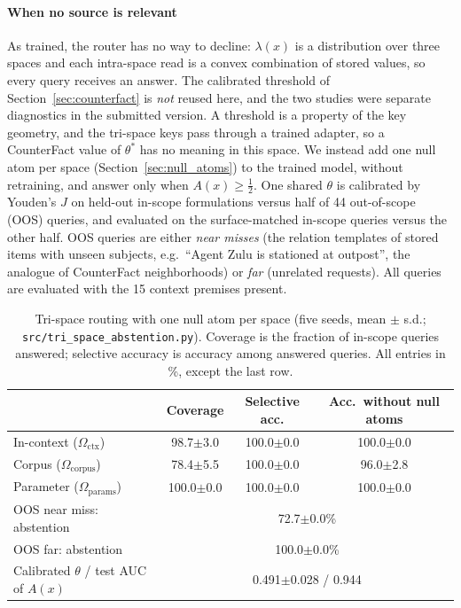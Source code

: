 \documentclass[preprint,12pt]{elsarticle}
\newcommand{\Om}{\Omega}
\newif\ifmarkchanges
\newcommand{\rev}[1]{\ifmarkchanges{\color{blue}#1}\else#1\fi}
\begin{document}
\paragraph{When no source is relevant}
\rev{As trained, the router has no way to decline: $\lambda(x)$ is a distribution over three spaces and each intra-space read is a convex combination of stored values, so every query receives an answer. The calibrated threshold of Section~\ref{sec:counterfact} is \emph{not} reused here, and the two studies were separate diagnostics in the submitted version. A threshold is a property of the key geometry, and the tri-space keys pass through a trained adapter, so a CounterFact value of $\theta^*$ has no meaning in this space. We instead add one null atom per space (Section~\ref{sec:null_atoms}) to the trained model, without retraining, and answer only when $A(x)\ge\tfrac12$. One shared $\theta$ is calibrated by Youden's $J$ on held-out in-scope formulations versus half of 44 out-of-scope (OOS) queries, and evaluated on the surface-matched in-scope queries versus the other half. OOS queries are either \emph{near misses} (the relation templates of stored items with unseen subjects, e.g.\ ``Agent Zulu is stationed at outpost'', the analogue of CounterFact neighborhoods) or \emph{far} (unrelated requests). All queries are evaluated with the 15 context premises present.}

\begin{table}[t]
\centering
\caption{\rev{Tri-space routing with one null atom per space (five seeds, mean $\pm$ s.d.; \texttt{src/tri\_space\_abstention.py}). Coverage is the fraction of in-scope queries answered; selective accuracy is accuracy among answered queries. All entries in \%, except the last row.}}
\label{tab:abstention}
\vspace{0.5em}
\footnotesize
\begin{tabular}{@{}lccc@{}}
\toprule
 & Coverage & Selective acc. & Acc.\ without null atoms \\
\midrule
In-context ($\Om_{\mathrm{ctx}}$) & 98.7$\pm$3.0 & 100.0$\pm$0.0 & 100.0$\pm$0.0 \\
Corpus ($\Om_{\mathrm{corpus}}$) & 78.4$\pm$5.5 & 100.0$\pm$0.0 & 96.0$\pm$2.8 \\
Parameter ($\Om_{\mathrm{params}}$) & 100.0$\pm$0.0 & 100.0$\pm$0.0 & 100.0$\pm$0.0 \\
\midrule
OOS near miss: abstention & \multicolumn{3}{c}{72.7$\pm$0.0\%} \\
OOS far: abstention & \multicolumn{3}{c}{100.0$\pm$0.0\%} \\
Calibrated $\theta$ / test AUC of $A(x)$ & \multicolumn{3}{c}{0.491$\pm$0.028 / 0.944} \\
\bottomrule
\end{tabular}
\end{table}
\end{document}
